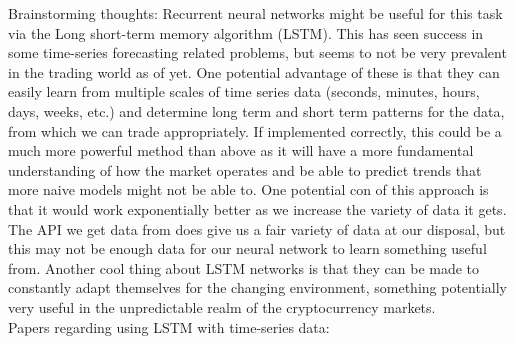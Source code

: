 \documentclass{article}
\begin{document}
Brainstorming thoughts: Recurrent neural networks might be useful for this task via the Long short-term memory algorithm (LSTM). This has seen success in some time-series forecasting related problems, but seems to not be very prevalent in the trading world as of yet. One potential advantage of these is that they can easily learn from multiple scales of time series data (seconds, minutes, hours, days, weeks, etc.) and determine long term and short term patterns for the data, from which we can trade appropriately. If implemented correctly, this could be a much more powerful method than above as it will have a more fundamental understanding of how the market operates and be able to predict trends that more naive models might not be able to. One potential con of this approach is that it would work exponentially better as we increase the variety of data it gets. The API we get data from does give us a fair variety of data at our disposal, but this may not be enough data for our neural network to learn something useful from. Another cool thing about LSTM networks is that they can be made to constantly adapt themselves for the changing environment, something potentially very useful in the unpredictable realm of the cryptocurrency markets. \\\newline
Papers regarding using LSTM with time-series data:
\end{document}
